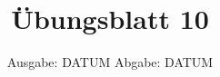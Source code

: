 

\title{Übungsblatt 10}
\date{%
  Ausgabe: DATUM %
  \hspace{3em}
  Abgabe: DATUM %
}



\maketitle
\thispagestyle{empty}
\tableofcontents
\newpage






